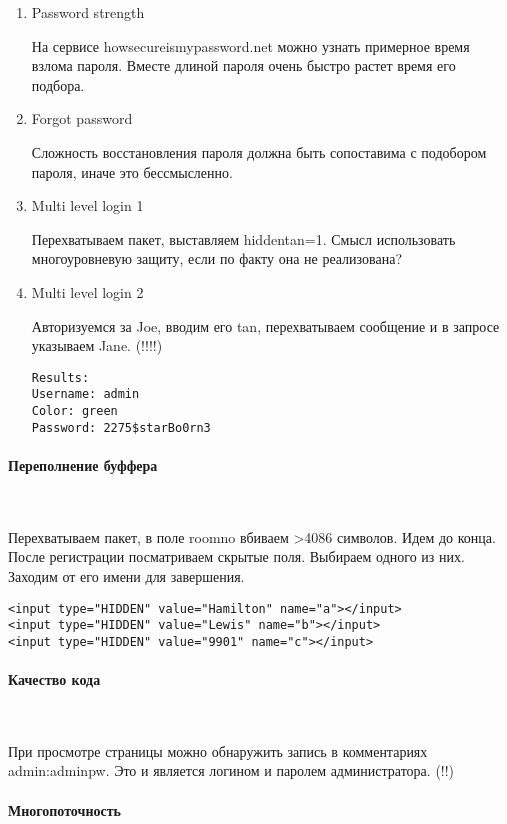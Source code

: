 \documentclass{article}
\begin{document}
\begin{enumerate}
\item Password strength

На сервисе howsecureismypassword.net можно узнать примерное время взлома пароля. Вместе длиной пароля очень быстро растет время его подбора.

\item Forgot password

Сложность восстановления пароля должна быть сопоставима с подобором пароля, иначе это бессмысленно.

\item Multi level login 1

Перехватываем пакет, выставляем hiddentan=1. Смысл использовать многоуровневую защиту, если по факту она не реализована?

\item Multi level login 2

Авторизуемся за Joe, вводим его tan, перехватываем сообщение и в запросе указываем Jane. (!!!!)
\begin{verbatim}
Results:
Username: admin
Color: green
Password: 2275$starBo0rn3
\end{verbatim}
\end{enumerate}

\paragraph{Переполнение буффера}
~

Перехватываем пакет, в поле roomno вбиваем >4086 символов. Идем до конца. После регистрации посматриваем скрытые поля. Выбираем одного из них. Заходим от его имени для завершения.

\begin{verbatim}
<input type="HIDDEN" value="Hamilton" name="a"></input>
<input type="HIDDEN" value="Lewis" name="b"></input>
<input type="HIDDEN" value="9901" name="c"></input>
\end{verbatim}

\paragraph{Качество кода}
~

При просмотре страницы можно обнаружить запись в комментариях admin:adminpw. Это и является логином и паролем администратора. (!!)

\paragraph{Многопоточность}
~
\end{document}

